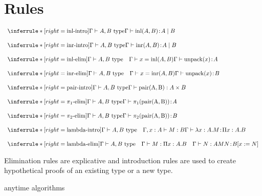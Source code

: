 \section{Rules}

\newcommand{\universe}{\mathcal{U}}
\newcommand{\type}{\ \mathrm{type}}
\def\judg#1:#2{#1 \oftype #2}


\[
\begin{array}{l}
    \inferrule*[right=\text{inl-intro}]{
        \Gamma \vdash A, B \type}{
        \Gamma \vdash \mathrm{inl}(A, B) \oftype A \mid B} \\
    \\
    \inferrule*[right=\text{inr-intro}]{
        \Gamma \vdash A, B \type}{
        \Gamma \vdash \mathrm{inr}(A, B) \oftype A \mid B} \\
    \\
    \inferrule*[right=\text{inl-elim}]{
        \Gamma \vdash A, B \type \quad \Gamma \vdash x = \mathrm{inl}(A, B)}{
        \Gamma \vdash \mathrm{unpack}(x) \oftype A} \\
    \\
    \inferrule*[right=\text{inr-elim}]{
        \Gamma \vdash A, B \type \quad \Gamma \vdash x = \mathrm{inr}(A, B)}{
        \Gamma \vdash \mathrm{unpack}(x) \oftype B} \\
    \\
    \inferrule*[right=\text{pair-intro}]{
        \Gamma \vdash A, B \type}{
        \Gamma \vdash \mathrm{pair(A, B)} : A \times B} \\
    \\
    \inferrule*[right=\text{$\pi_1$-elim}]{
        \Gamma \vdash A, B \type}{
        \Gamma \vdash \pi_1(\mathrm{pair(A, B)}) \oftype A} \\
    \\
    \inferrule*[right=\text{$\pi_2$-elim}]{
        \Gamma \vdash A, B \type}{
        \Gamma \vdash \pi_2(\mathrm{pair(A, B)}) \oftype B} \\
    \\
    \inferrule*[right=\text{lambda-intro}]{
        \Gamma \vdash A, B \type \quad \Gamma, x:A \vdash M:B}{
        \Gamma \vdash \lambda x:A.M \oftype \Pi x:A.B
    } \\
    \\
    \inferrule*[right=\text{lambda-elim}]{
        \Gamma \vdash A, B \type \quad \Gamma \vdash M:\Pi x:A.B \quad \Gamma \vdash N:A}{
        MN \oftype B[x := N]
    }\\
\end{array}
\]

Elimination rules are explicative and introduction rules are used to create hypothetical proofs of an existing type or a new type.

anytime algorithms